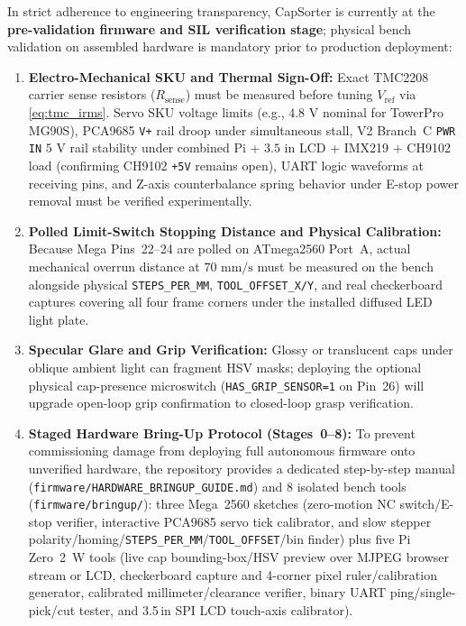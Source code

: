 \documentclass[10pt,twocolumn,letterpaper]{article}
\begin{document}
In strict adherence to engineering transparency, CapSorter is currently at the \textbf{pre-validation firmware and SIL verification stage}; physical bench validation on assembled hardware is mandatory prior to production deployment:
\begin{enumerate}
  \item \textbf{Electro-Mechanical SKU and Thermal Sign-Off:} Exact TMC2208 carrier sense resistors ($R_{\mathrm{sense}}$) must be measured before tuning $V_{\mathrm{ref}}$ via \cref{eq:tmc_irms}. Servo SKU voltage limits (e.g., $4.8\text{ V}$ nominal for TowerPro MG90S), PCA9685 \texttt{V+} rail droop under simultaneous stall, V2 Branch~C \texttt{PWR IN} $5\text{ V}$ rail stability under combined Pi + $3.5\text{ in}$ LCD + IMX219 + CH9102 load (confirming CH9102 \texttt{+5V} remains open), UART logic waveforms at receiving pins, and Z-axis counterbalance spring behavior under E-stop power removal must be verified experimentally.
  \item \textbf{Polled Limit-Switch Stopping Distance and Physical Calibration:} Because Mega Pins~22--24 are polled on ATmega2560 Port~A, actual mechanical overrun distance at $70\text{ mm/s}$ must be measured on the bench alongside physical \texttt{STEPS\_PER\_MM}, \texttt{TOOL\_OFFSET\_X/Y}, and real checkerboard captures covering all four frame corners under the installed diffused LED light plate.
  \item \textbf{Specular Glare and Grip Verification:} Glossy or translucent caps under oblique ambient light can fragment HSV masks; deploying the optional physical cap-presence microswitch (\texttt{HAS\_GRIP\_SENSOR=1} on Pin~26) will upgrade open-loop grip confirmation to closed-loop grasp verification.
  \item \textbf{Staged Hardware Bring-Up Protocol (Stages~0--8):} To prevent commissioning damage from deploying full autonomous firmware onto unverified hardware, the repository provides a dedicated step-by-step manual (\texttt{firmware/HARDWARE\_BRINGUP\_GUIDE.md}) and 8 isolated bench tools (\texttt{firmware/bringup/}): three Mega~2560 sketches (zero-motion NC switch/E-stop verifier, interactive PCA9685 servo tick calibrator, and slow stepper polarity/homing/\texttt{STEPS\_PER\_MM}/\texttt{TOOL\_OFFSET}/bin finder) plus five Pi Zero~2~W tools (live cap bounding-box/HSV preview over MJPEG browser stream or LCD, checkerboard capture and 4-corner pixel ruler/calibration generator, calibrated millimeter/clearance verifier, binary UART ping/single-pick/cut tester, and 3.5\,in SPI LCD touch-axis calibrator).
\end{enumerate}
\end{document}
